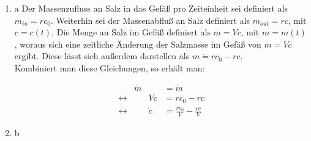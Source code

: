 \documentclass[german]{uebung}
\begin{document}
\begin{exercise}{1}
	\begin{enumerate}[label=(\alph*)]
		\item a
	Der Massenzufluss an Salz in das Gef\"a{\ss} pro Zeiteinheit sei definiert als $m_{in} = rc_0$.
	Weiterhin sei der Massenabflu{\ss} an Salz definiert als $m_{out} = rc$, mit $c = c(t)$.
	Die Menge an Salz im Gef\"a{\ss} definiert als $m = Vc$, mit $m = m(t)$, woraus sich eine
	zeitliche {\"A}nderung der Salzmasse im Gef\"a{\ss} von $\dot{m} = V\dot{c}$ ergibt.
	Diese l\"asst sich au{\ss}erdem darstellen als $m\dot = rc_0 - rc$.\\
	Kombiniert man diese Gleichungen, so erh\"alt man:

		\begin{alignat}{3}
			& \dot{m}	&&= \dot{m}	\\
			\leftrightarrow && V\dot{c}&= rc_0 - rc	\\
			\leftrightarrow	&& \dot{c} &= \frac{rc_0}{V} - \frac{rc}{V}
		\end{alignat}

		\item b
	\end{enumerate}
\end{exercise}
\end{document}
